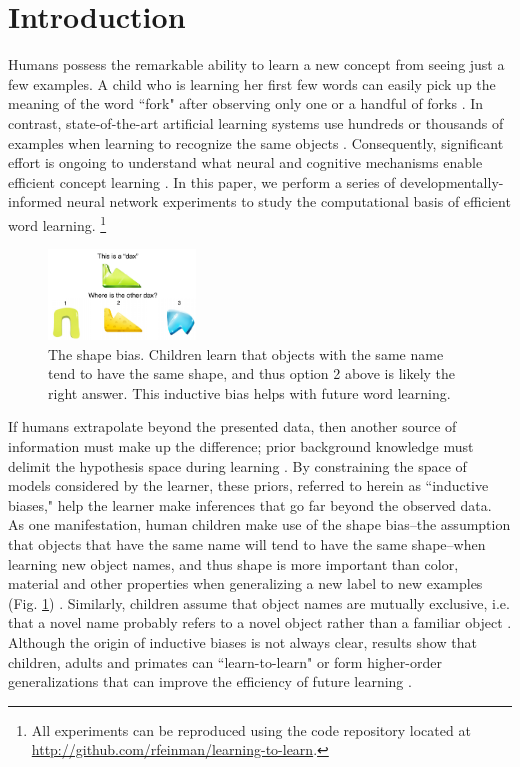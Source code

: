 \section{Introduction}

Humans possess the remarkable ability to learn a new concept from seeing just a
few examples. A child who is learning her first few words can easily pick up
the meaning of the word ``fork" after observing only one or a handful of forks
\citep{Bloom2000}. In contrast, state-of-the-art artificial learning systems use
hundreds or thousands of examples when learning to recognize the same objects
\citep[e.g.,][]{Krizhevsky2012, Szegedy2015}. Consequently, significant
effort is ongoing to understand what neural and cognitive mechanisms enable
efficient concept learning \citep{Lake2017}. In this paper, we perform a series
of developmentally-informed neural network experiments to study the
computational basis of efficient word learning. \footnote{All experiments can be
reproduced using the code repository located at
\url{http://github.com/rfeinman/learning-to-learn}.}

\begin{figure}[h!]
    \begin{center}
        \includegraphics[width=0.35\textwidth]{figures/shape_bias_demo.pdf}
    \end{center}
    \caption{The shape bias. Children learn that objects with the same name
    tend to have the same shape, and thus option 2 above is likely the right
    answer. This inductive bias helps with future word learning.}
    \label{fig:shape_bias_demo}
\end{figure}

If humans extrapolate beyond the presented data, then another source of
information must make up the difference; prior background knowledge must
delimit the hypothesis space during learning \citep{Tenenbaum2011, Lake2017}. By
constraining the space of models considered by the learner, these priors,
referred to herein as ``inductive biases," help the learner make inferences
that go far beyond the observed data. As one manifestation, human children make
use of the shape bias--the assumption that objects that have the same name will
tend to have the same shape--when learning new object names, and thus shape is
more important than color, material and other properties when generalizing a
new label to new examples (Fig. \ref{fig:shape_bias_demo}) \citep{Landau1988}.
Similarly, children assume that object names are mutually exclusive, i.e. that
a novel name probably refers to a novel object rather than a familiar object
\citep{Markman1988}. Although the origin of inductive biases is not always
clear, results show that children, adults and primates can ``learn-to-learn" or
form higher-order generalizations that can improve the efficiency of future
learning \citep{Harlow1949, Smith2002, Dewar2010}.

